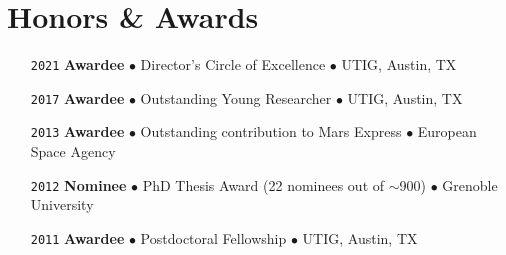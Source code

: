 \section*{Honors \& Awards}

\begin{itemize}[leftmargin=3.8em, labelsep=1.5em]
    \setlength\itemsep{-.5em}
    \item[\texttt{2021}] \textbf{Awardee} $\bullet$ Director's Circle of Excellence $\bullet$ UTIG, Austin, TX
    \item[\texttt{2017}] \textbf{Awardee} $\bullet$ Outstanding Young Researcher $\bullet$ UTIG, Austin, TX
    \item[\texttt{2013}] \textbf{Awardee} $\bullet$ Outstanding contribution to Mars Express $\bullet$ European Space Agency
    \item[\texttt{2012}] \textbf{Nominee} $\bullet$ PhD Thesis Award (22 nominees out of $\sim$900) $\bullet$ Grenoble University
    \item[\texttt{2011}] \textbf{Awardee} $\bullet$ Postdoctoral Fellowship $\bullet$ UTIG, Austin, TX
    
\end{itemize}

